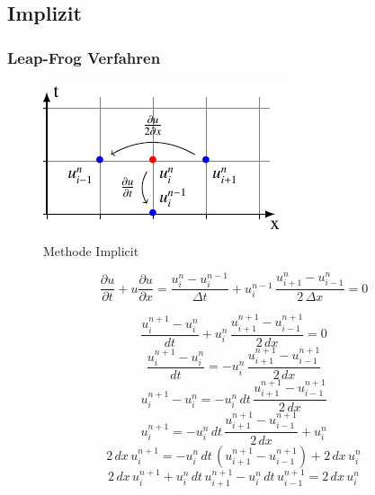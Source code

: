 \subsection{Implizit}
\subsubsection{Leap-Frog Verfahren}

     \begin{figure}[!ht]
	\centering
	\includegraphics[height=.4\textwidth]{papers/burgers/BurgersEquation/tikz/implicit/implicit.pdf}
	\caption{Methode Implicit}
	\label{burgers:fig:Implicit}
\end{figure}

\begin{equation}
\frac {\partial u}{\partial t}+u{\frac {\partial u}{\partial x}} = \frac{u_{i}^{n}-u_{i}^{n-1}}{\Delta t}+ u_{i}^{n-1}\, \frac{u_{i+1}^{n}-u_{i-1}^{n}}{2\,\Delta x}=0
\end{equation}


\begin{equation}
    \frac{u_{i}^{n+1}-u_{i}^{n}}{dt} + u_{i}^{n} \, \frac{u_{i+1}^{n+1} - u_{i-1}^{n+1}}{2 \, dx} = 0
\end{equation}
\begin{equation}
  \frac{u_{i}^{n+1}-u_{i}^{n}}{dt} = -u_{i}^{n} \, \frac{u_{i+1}^{n+1} - u_{i-1}^{n+1}}{2 \, dx}
\end{equation}
\begin{equation}
  u_{i}^{n+1}-u_{i}^{n} = -u_{i}^{n} \, dt \, \frac{u_{i+1}^{n+1} - u_{i-1}^{n+1}}{2 \, dx}
\end{equation}
\begin{equation}
  u_{i}^{n+1} = -u_{i}^{n} \, dt \, \frac{u_{i+1}^{n+1} - u_{i-1}^{n+1}}{2 \, dx} + u_{i}^{n}
\end{equation}
\begin{equation}
2 \, dx \,  u_{i}^{n+1} = -u_{i}^{n} \, dt \, \left(u_{i+1}^{n+1} - u_{i-1}^{n+1} \right) + 2 \, dx \, u_{i}^{n}
\end{equation}
\begin{equation}
  2 \, dx \,  u_{i}^{n+1} + u_{i}^{n} \, dt \, u_{i+1}^{n+1} -u_{i}^{n} \, dt \, u_{i-1}^{n+1} =  2 \, dx \, u_{i}^{n}
\end{equation}


